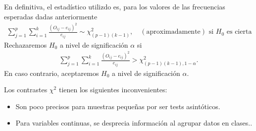 En definitiva, el estadístico utilizdo es, para los valores de las frecuencias esperadas dadas anteriormente
\begin{align*}
    \sum_{j=1}^{p}\sum_{i=1}^{k} \frac{(O_{ij} - e_{ij})^2}{e_{ij}} \sim \chi^2_{(p-1)(k-1)}, \quad (\text{aproximadamente}) \text{ si $H_0$ es cierta}
\end{align*}
Rechazaremos $H_0$ a nivel de significación $\alpha$ si
\begin{align*}
    \sum_{j=1}^{p}\sum_{i=1}^{k} \frac{(O_{ij} - e_{ij})^2}{e_{ij}} > \chi^2_{(p-1)(k-1), 1 - \alpha}.
\end{align*}
En caso contrario, aceptaremos $H_0$ a nivel de significación $\alpha$.
\begin{obs}
    Los contrastes $\chi^2$ tienen los siguientes inconvenientes:
    \begin{itemize}
        \item Son poco precisos para muestras pequeñas por ser tests asintóticos.
        \item Para variables continuas, se desprecia información al agrupar datos en clases..
    \end{itemize}
\end{obs}